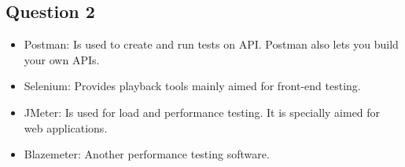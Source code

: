 \subsection*{Question 2}

\begin{itemize}
    \item Postman: Is used to create and run tests on API. Postman also lets you build your own APIs.
    \item Selenium: Provides playback tools mainly aimed for front-end testing. 
    \item JMeter: Is used for load and performance testing. It is specially aimed for web applications.
    \item Blazemeter: Another performance testing software.
\end{itemize}